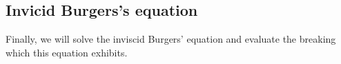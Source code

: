 \begin{figure}[ht]
    \centering
    
\end{figure}


%

\begin{figure}[ht]
    \centering
    
\end{figure}

\subsection{Invicid Burgers's equation}

Finally, we will solve the inviscid Burgers' equation and evaluate the breaking which this equation exhibits. 

\begin{figure}[ht]
    \centering
    
\end{figure}
